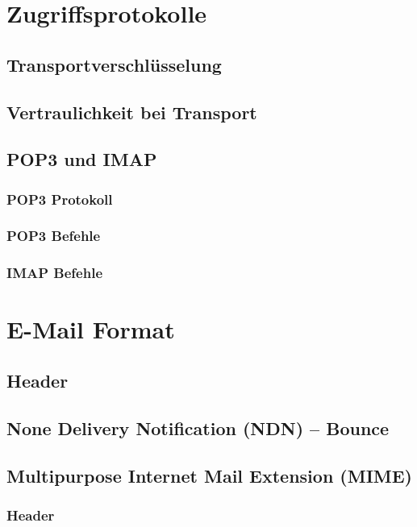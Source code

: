 \section{Zugriffsprotokolle}
\subsection{Transportverschlüsselung}
\subsection{Vertraulichkeit bei Transport}
\subsection{POP3 und IMAP}
\subsubsection{POP3 Protokoll}
\subsubsection{POP3 Befehle}
\subsubsection{IMAP Befehle}

\section{E-Mail Format}
\subsection{Header}
\subsection{None Delivery Notification (NDN) -- Bounce}
\subsection{Multipurpose Internet Mail Extension (MIME)}
\subsubsection{Header}
